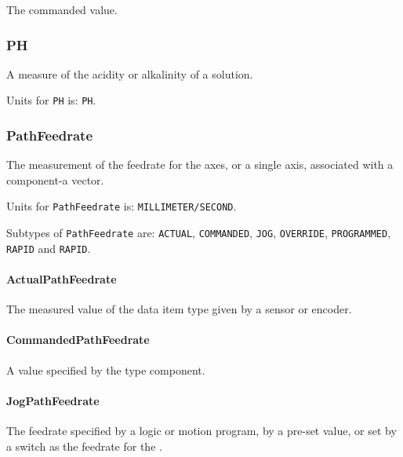 The commanded value.


\subsubsection{PH}
\label{sec:PH}



A measure of the acidity or alkalinity of a solution.


Units for \texttt{PH} is: \texttt{PH}.

\FloatBarrier

\subsubsection{PathFeedrate}
\label{sec:PathFeedrate}



The measurement of the feedrate for the axes, or a single axis, associated with a  component-a vector.


Units for \texttt{PathFeedrate} is: \texttt{MILLIMETER/SECOND}.


Subtypes of \texttt{PathFeedrate} are: \texttt{ACTUAL}, \texttt{COMMANDED}, \texttt{JOG}, \texttt{OVERRIDE}, \texttt{PROGRAMMED}, \texttt{RAPID} and \texttt{RAPID}. 
\FloatBarrier

\paragraph{ActualPathFeedrate}\mbox{}
\label{sec:ActualPathFeedrate}



The measured value of the data item type given by a sensor or encoder.


\paragraph{CommandedPathFeedrate}\mbox{}
\label{sec:CommandedPathFeedrate}



A value specified by the  type component.


\paragraph{JogPathFeedrate}\mbox{}
\label{sec:JogPathFeedrate}



The feedrate specified by a logic or motion program, by a pre-set value, or set by a switch as the feedrate for the . 


